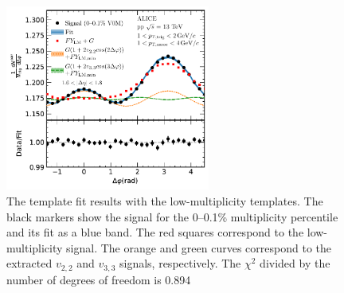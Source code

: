\begin{figure}[h!]
	\centering
	\hspace{-3em}\includegraphics[width=0.6\textwidth]{figures/Fig1_FlowExt.pdf} 
	\caption{The template fit results with the low-multiplicity templates. The black markers show the signal for the 0--0.1\% multiplicity percentile and its fit as a blue band. The red squares correspond to the low-multiplicity signal. The orange and green curves correspond to the extracted $v_{2,2}$ and $v_{3,3}$ signals, respectively. The $\chi^{2}$ divided by the number of degrees of freedom is 0.894}
	\label{fig:flowext}
\end{figure}

